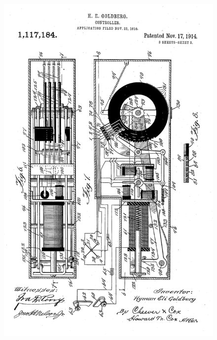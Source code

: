 \begin{figure}[htbp]
\begin{center}
\includegraphics[scale=0.3]{images/goldberg2.png}

\end{center}
\end{figure}

